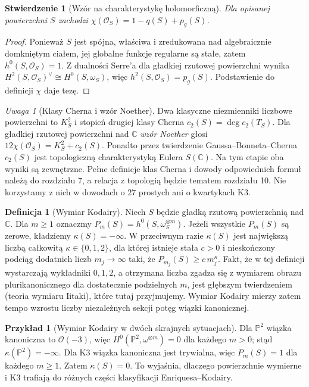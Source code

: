 \documentclass[11pt,a4paper,openany]{report}
\numberwithin{equation}{section}
\theoremstyle{plain}
\newtheorem{stwierdzenie}[twierdzenie]{Stwierdzenie}
\theoremstyle{definition}
\newtheorem{definicja}[twierdzenie]{Definicja}
\newtheorem{przyklad}[twierdzenie]{Przykład}
\theoremstyle{remark}
\newtheorem{uwaga}[twierdzenie]{Uwaga}
\newcommand{\C}{\mathbb C}
\newcommand{\PP}{\mathbb P}
\begin{document}
\begin{stwierdzenie}[Wzór na charakterystykę holomorficzną]
\label{st:ga6-chi}
Dla opisanej powierzchni $S$ zachodzi
$\chi(\mathcal O_S)=1-q(S)+p_g(S)$.
\end{stwierdzenie}
\begin{proof}
Ponieważ $S$ jest spójna, właściwa i zredukowana
nad algebraicznie domkniętym ciałem, jej globalne
funkcje regularne są stałe, zatem
$h^0(S,\mathcal O_S)=1$. Z dualności Serre'a
dla gładkiej rzutowej powierzchni wynika
$H^2(S,\mathcal O_S)^\vee\cong H^0(S,\omega_S)$,
więc $h^2(S,\mathcal O_S)=p_g(S)$.
Podstawienie do definicji $\chi$ daje tezę.
\end{proof}

\begin{uwaga}[Klasy Cherna i wzór Noether]
Dwa klasyczne niezmienniki liczbowe powierzchni
to $K_S^2$ i stopień drugiej klasy Cherna
$c_2(S)=\deg c_2(T_S)$. Dla gładkiej rzutowej
powierzchni nad $\C$ \emph{wzór Noether} głosi
$12\chi(\mathcal O_S)=K_S^2+c_2(S)$.
Ponadto przez twierdzenie Gaussa--Bonneta--Cherna
$c_2(S)$ jest topologiczną charakterystyką Eulera
$S(\C)$. Na tym etapie oba wyniki są zewnętrzne.
Pełne definicje klas Cherna i dowody odpowiednich
formuł należą do rozdziału 7, a relacja z topologią
będzie tematem rozdziału 10. Nie korzystamy z nich
w dowodach o $27$ prostych ani o kwartykach K3.
\end{uwaga}

\begin{definicja}[Wymiar Kodairy]
Niech $S$ będzie gładką rzutową powierzchnią nad $\C$.
Dla $m\ge1$ oznaczmy
$P_m(S)=h^0(S,\omega_S^{\otimes m})$.
Jeżeli wszystkie $P_m(S)$ są zerowe, kładziemy
$\kappa(S)=-\infty$. W przeciwnym razie
$\kappa(S)$ jest największą liczbą całkowitą
$\kappa\in\{0,1,2\}$, dla której istnieje stała
$c>0$ i nieskończony podciąg dodatnich liczb
$m_j\to\infty$ taki, że
$P_{m_j}(S)\ge c\,m_j^{\kappa}$.
Fakt, że w tej definicji wystarczają wykładniki
$0,1,2$, a otrzymana liczba zgadza się z wymiarem obrazu
plurikanonicznego dla dostatecznie podzielnych $m$,
jest głębszym twierdzeniem (teoria wymiaru Iitaki),
które tutaj przyjmujemy.
Wymiar Kodairy mierzy zatem tempo wzrostu
liczby niezależnych sekcji potęg wiązki kanonicznej.
\end{definicja}

\begin{przyklad}[Wymiar Kodairy w dwóch skrajnych sytuacjach]
Dla $\PP^2$ wiązka kanoniczna to $\mathcal O(-3)$,
więc $H^0(\PP^2,\omega^{\otimes m})=0$
dla każdego $m>0$; stąd $\kappa(\PP^2)=-\infty$.
Dla K3 wiązka kanoniczna jest trywialna,
więc $P_m(S)=1$ dla każdego $m\ge1$.
Zatem $\kappa(S)=0$. To wyjaśnia, dlaczego
powierzchnie wymierne i K3 trafiają do różnych
części klasyfikacji Enriquesa--Kodairy.
\end{przyklad}
\end{document}
